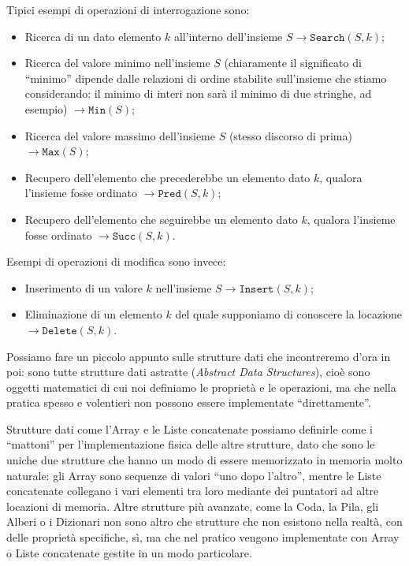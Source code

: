 \documentclass[12pt]{report}
\begin{document}
    Tipici esempi di operazioni di interrogazione sono:
    \begin{itemize}
    	\item Ricerca di un dato elemento $k$ all'interno dell'insieme $S \rightarrow \texttt{Search}(S, k)$;
    	\item Ricerca del valore minimo nell'insieme $S$ (chiaramente il significato di ``minimo'' dipende dalle relazioni di ordine stabilite sull'insieme che stiamo considerando: il minimo di interi non sarà il minimo di due stringhe, ad esempio) $\rightarrow \texttt{Min}(S)$;
    	\item Ricerca del valore massimo dell'insieme $S$ (stesso discorso di prima) $\rightarrow \texttt{Max}(S)$;
    	\item Recupero dell'elemento che precederebbe un elemento dato $k$, qualora l'insieme fosse ordinato $\rightarrow \texttt{Pred}(S, k)$;
    	\item Recupero dell'elemento che seguirebbe un elemento dato $k$, qualora l'insieme fosse ordinato $\rightarrow \texttt{Succ}(S, k)$.
    \end{itemize}
    
    Esempi di operazioni di modifica sono invece:
    \begin{itemize}
    	\item Inserimento di un valore $k$ nell'insieme $S \rightarrow \texttt{Insert}(S, k)$;
    	\item Eliminazione di un elemento $k$ del quale supponiamo di conoscere la locazione $\rightarrow \texttt{Delete}(S, k)$.
    \end{itemize}
    
    Possiamo fare un piccolo appunto sulle strutture dati che incontreremo d'ora in poi: sono tutte strutture dati astratte (\textit{Abstract Data Structures}), cioè sono oggetti matematici di cui noi definiamo le proprietà e le operazioni, ma che nella pratica spesso e volentieri non possono essere implementate ``direttamente''. 
    
    Strutture dati come l'Array e le Liste concatenate possiamo definirle come i ``mattoni'' per l'implementazione fisica delle altre strutture, dato che sono le uniche due strutture che hanno un modo di essere memorizzato in memoria molto naturale: gli Array sono sequenze di valori ``uno dopo l'altro'', mentre le Liste concatenate collegano i vari elementi tra loro mediante dei puntatori ad altre locazioni di memoria. Altre strutture più avanzate, come la Coda, la Pila, gli Alberi o i Dizionari non sono altro che strutture che non esistono nella realtà, con delle proprietà specifiche, sì, ma che nel pratico vengono implementate con Array o Liste concatenate gestite in un modo particolare.
    
\end{document}
